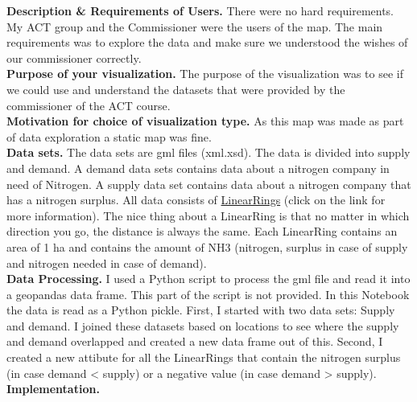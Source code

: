 \documentclass{article}
\begin{document}
\noindent
\textbf{Description \& Requirements of Users.}
There were no hard requirements.
My ACT group and the Commissioner were the users of the map. 
The main requirements was to explore the data and make sure we understood the wishes of our commissioner correctly.
\\

\noindent
\textbf{Purpose of your visualization.}
The purpose of the visualization was to see if we could use and understand the datasets that were provided by the commissioner of the ACT course.
\\

\noindent
\textbf{Motivation for choice of visualization type.}
As this map was made as part of data exploration a static map was fine.
\\

\noindent
\textbf{Data sets.}
The data sets are gml files (xml.xsd).
The data is divided into supply and demand.
A demand data sets contains data about a nitrogen company in need of Nitrogen. 
A supply data set contains data about a nitrogen company that has a nitrogen surplus.
All data consists of \href{https://shapely.readthedocs.io/en/stable/manual.html#linearrings}{LinearRings} (click on the link for more information).
The nice thing about a LinearRing is that no matter in which direction you go, the distance is always the same.
Each LinearRing contains an area of 1 ha and contains the amount of NH3 (nitrogen, surplus in case of supply and nitrogen needed in case of demand).
\\

\noindent
\textbf{Data Processing.}
I used a Python script to process the gml file and read it into a geopandas data frame. 
This part of the script is not provided.
In this Notebook the data is read as a Python pickle. 
First, I started with two data sets: Supply and demand.
I joined these datasets based on locations to see where the supply and demand overlapped and created a new data frame out of this.
Second, I created a new attibute for all the LinearRings that contain the nitrogen surplus (in case demand < supply) or a negative value (in case demand > supply).
\\

\noindent
\textbf{Implementation.}
\end{document}
